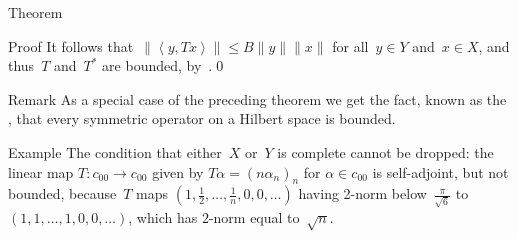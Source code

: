 \documentclass[a]{subfiles}
\begin{document}
\begin{parsec}
\begin{point}{Theorem}
\begin{point}{Proof}
It follows that~$\|\left<y,Tx\right>\|\leq B\|y\|\|x\|$
for all~$y\in Y$ and~$x\in X$,
and thus~$T$ and~$T^*$ are bounded, by~.\qed
\end{point}
\begin{point}{Remark}%
As a special case of the preceding theorem
we get the fact,
known as the ,
that every symmetric
operator on a Hilbert space is bounded.
\end{point}
\begin{point}{Example}%
The condition that either~$X$ or~$Y$ is complete cannot be dropped:
the linear map $T\colon c_{00}\to c_{00}$
given by $T\alpha = (n\alpha_n)_n$ for $\alpha\in c_{00}$
is self-adjoint,
but not bounded,
because~$T$ maps $(1,\frac{1}{2},\dotsc,\frac{1}{n},0,0,\dotsc)$
having 2-norm below~$\frac{\pi}{\sqrt{6}}$
to $(1,1,\dotsc,1,0,0,\dotsc)$,
which has $2$-norm equal to~$\sqrt{n}$.
\end{point}
\end{point}
\end{parsec}
\end{document}
